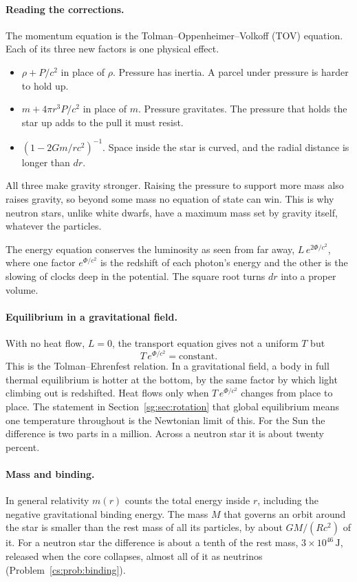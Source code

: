 \paragraph{Reading the corrections.} The momentum equation is the Tolman–Oppenheimer–Volkoff (TOV) equation. Each of its three new factors is one physical effect.
\begin{itemize}
	\item $\rho+P/c^2$ in place of $\rho$. Pressure has inertia. A parcel under pressure is harder to hold up.
	\item $m+4\pi r^3P/c^2$ in place of $m$. Pressure gravitates. The pressure that holds the star up adds to the pull it must resist.
	\item $(1-2Gm/rc^2)^{-1}$. Space inside the star is curved, and the radial distance is longer than $dr$.
\end{itemize}
All three make gravity stronger. Raising the pressure to support more mass also raises gravity, so beyond some mass no equation of state can win. This is why neutron stars, unlike white dwarfs, have a maximum mass set by gravity itself, whatever the particles.

The energy equation conserves the luminosity as seen from far away, $L\,e^{2\Phi/c^2}$, where one factor $e^{\Phi/c^2}$ is the redshift of each photon's energy and the other is the slowing of clocks deep in the potential. The square root turns $dr$ into a proper volume.

\paragraph{Equilibrium in a gravitational field.} With no heat flow, $L=0$, the transport equation gives not a uniform $T$ but
\begin{equation}
	\boxed{T\,e^{\Phi/c^2}=\text{constant}.}
	\label{cs:eq:tolman}
\end{equation}
This is the Tolman–Ehrenfest relation. In a gravitational field, a body in full thermal equilibrium is hotter at the bottom, by the same factor by which light climbing out is redshifted. Heat flows only when $T\,e^{\Phi/c^2}$ changes from place to place. The statement in Section~\ref{sg:sec:rotation} that global equilibrium means one temperature throughout is the Newtonian limit of this. For the Sun the difference is two parts in a million. Across a neutron star it is about twenty percent.

\paragraph{Mass and binding.} In general relativity $m(r)$ counts the total energy inside $r$, including the negative gravitational binding energy. The mass $M$ that governs an orbit around the star is smaller than the rest mass of all its particles, by about $GM/(Rc^2)$ of it. For a neutron star the difference is about a tenth of the rest mass, $3\times10^{46}\,\mathrm J$, released when the core collapses, almost all of it as neutrinos (Problem~\ref{cs:prob:binding}).

